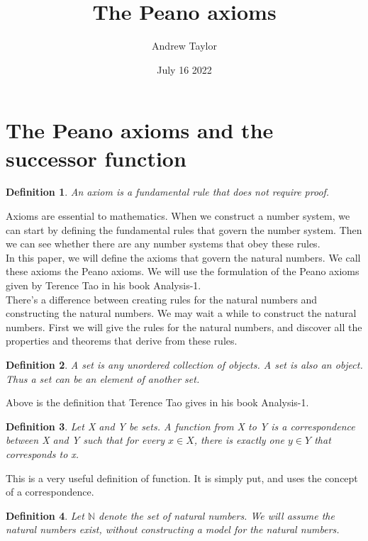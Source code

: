 \documentclass{article}
\title{The Peano axioms}
\author{Andrew Taylor}
\date{July 16 2022}
\newtheorem{definition}{Definition}
\begin{document}
\maketitle

\section{The Peano axioms and the successor function}

\begin{definition}
An axiom is a fundamental rule that does not require proof.
\end{definition}

Axioms are essential to mathematics. When we construct a number system, we can start by defining the fundamental rules that govern the number system. Then we can see whether there are any number systems that obey these rules. \\

In this paper, we will define the axioms that govern the natural numbers. We call these axioms the Peano axioms. We will use the formulation of the Peano axioms given by Terence Tao in his book Analysis-1. \\

There's a difference between creating rules for the natural numbers and constructing the natural numbers. We may wait a while to construct the natural numbers. First we will give the rules for the natural numbers, and discover all the properties and theorems that derive from these rules.

\begin{definition}
A set is any unordered collection of objects. A set is also an object. Thus a set can be an element of another set.
\end{definition}

Above is the definition that Terence Tao gives in his book Analysis-1.

\begin{definition}
Let X and Y be sets. A function from X to Y is a correspondence between X and Y such that for every $x \in X$, there is exactly one $y \in Y$ that corresponds to x. 
\end{definition}

This is a very useful definition of function. It is simply put, and uses the concept of a correspondence.

\begin{definition}
Let $\mathbb{N}$ denote the set of natural numbers. We will assume the natural numbers exist, without constructing a model for the natural numbers.
\end{definition}
\end{document}
